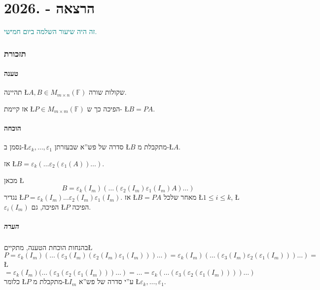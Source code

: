 \documentclass[english,hebrew]{article}
\begin{document}
\part{הרצאה {\endL} - {.2026\endL}}

\textcolor{teal}{זה היה שיעור השלמה ביום חמישי.}

\section{תזכורת}

\subsection{טענה}

תהיינה \L{$A,B\in M_{m\times n}(\mathbb{F})$} שקולות שורה.

אז קיימת \L{$P\in M_{m\times m}(\mathbb{F})$} הפיכה כך ש- \L{$B=PA$}.

\subsection{הוכחה}

נסמן ב-\L{$\varepsilon_{k},\dots,\varepsilon_{1}$} סדרה של פש\textquotedblright א
שבעזרתן \L{$B$} מתקבלת מ-\L{$A$}.

אז \L{$B=\varepsilon_{k}(\dots\varepsilon_{2}(\varepsilon_{1}(A))\dots)$}.

מכאן \L{%
\[
B=\varepsilon_{k}(I_{m})(\dots(\varepsilon_{2}(I_{m})\varepsilon_{1}(I_{m})A)\dots)
\]
}%
נגדיר \L{$P=\varepsilon_{k}(I_{m})\dots\varepsilon_{2}(I_{m})\varepsilon_{1}(I_{m})$}.
אז \L{$B=PA$} מאחר שלכל \L{$1\le i\le k$}, \L{$\varepsilon_{i}(I_{m})$}
הפיכה, גם \L{$P$} הפיכה.

\subsubsection{הערה}

בהנחות הוכחת הטענה, מתקיים\L{%
\[
P=\varepsilon_{k}(I_{m})(\dots(\varepsilon_{3}(I_{m})(\varepsilon_{2}(I_{m})\varepsilon_{1}(I_{m})))\dots)=\varepsilon_{k}(I_{m})(\dots(\varepsilon_{3}(I_{m})\varepsilon_{2}(\varepsilon_{1}(I_{m})))\dots)=
\]
}%
\L{%
\[
=\varepsilon_{k}(I_{m})(\dots(\varepsilon_{3}(\varepsilon_{2}(\varepsilon_{1}(I_{m})))\dots)=\dots=\varepsilon_{k}(\dots(\varepsilon_{3}(\varepsilon_{2}(\varepsilon_{1}(I_{m}))))\dots)
\]
}%
כלומר \L{$P$} מתקבלת מ-\L{$I_{m}$} ע\textquotedblright י סדרה של
פש\textquotedblright א \L{$\varepsilon_{k},\dots,\varepsilon_{1}$}.
\end{document}
